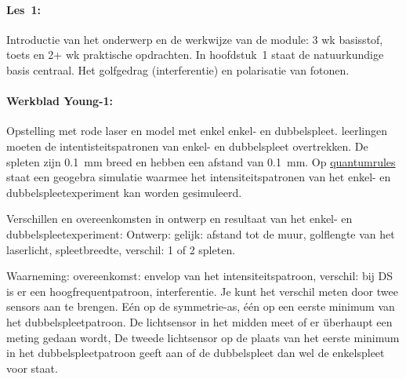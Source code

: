 \documentclass[../../main.tex]{subfiles}
\begin{document}
\paragraph*{Les~1:} Introductie van het onderwerp en de werkwijze van de module: 3 wk basisstof, toets en 2+ wk praktische opdrachten. In hoofdstuk~1 staat de natuurkundige basis centraal. Het golfgedrag (interferentie) en polarisatie van fotonen.

\paragraph*{Werkblad Young-1:}
Opstelling met rode laser en model met enkel enkel- en dubbelspleet.
leerlingen moeten de intentisteitspatronen van enkel- en dubbelspleet overtrekken. De spleten zijn \SI{0.1}{\milli\meter} breed en hebben een afstand van \SI{0.1}{\milli\meter}.
Op \href{www.quantumrules.nl}{quantumrules} staat een geogebra simulatie waarmee het  intensiteitspatronen van het enkel- en dubbelspleetexperiment kan worden gesimuleerd.

Verschillen en overeenkomsten in ontwerp en resultaat van het enkel- en dubbelspleetexperiment: Ontwerp: gelijk: afstand tot de muur, golflengte van het laserlicht, spleetbreedte, verschil: 1 of 2 spleten. 

Waarneming: overeenkomst: envelop van het intensiteitspatroon, verschil: bij DS is er een hoogfrequentpatroon, interferentie.
Je kunt het verschil meten door twee sensors aan te brengen. E\'en op de symmetrie-as, \'e\'en op een eerste minimum van het dubbelspleetpatroon. De lichtsensor in het midden meet of er \"uberhaupt een meting gedaan wordt, De tweede lichtsensor op de plaats van het eerste minimum in het dubbelspleetpatroon geeft aan of de dubbelspleet dan wel de enkelspleet voor staat.

\end{document}
